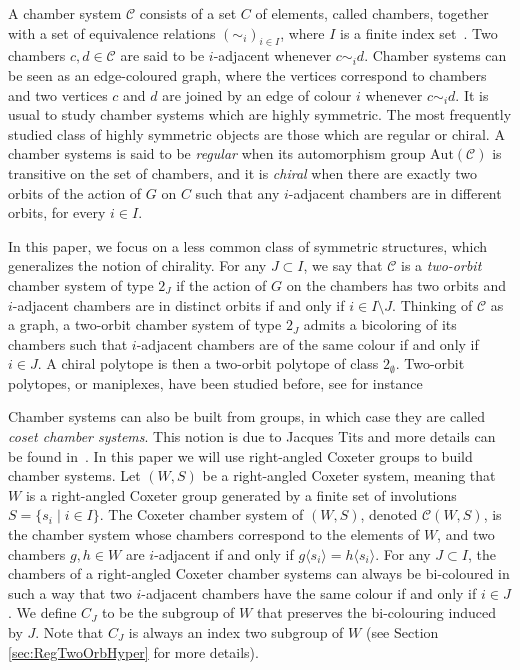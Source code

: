 \documentclass[11pt,letterpaper]{amsart}
\newcommand{\Aut}{\mathrm{Aut}}
\newcommand{\C}{\mathcal{C}}
\begin{document}
A chamber system $\C$ consists of a set $C$ of elements, called chambers, together with a set of equivalence relations $(\sim_i)_{i\in I}$, where $I$ is a finite index set~\cite{buekenhout2013diagram}. Two chambers $c,d\in \C$ are said to be $i$-adjacent whenever $c\sim_i d$. Chamber systems can be seen as an edge-coloured graph, where the vertices correspond to chambers and two vertices $c$ and $d$ are joined by an edge of colour $i$ whenever $c \sim_i d$.
It is usual to study chamber systems which are highly symmetric. The most frequently studied class of highly symmetric objects are those which are regular or chiral. A chamber systems is said to be \emph{regular} when its automorphism group $\Aut(\C)$ is transitive on the set of chambers, and it is \emph{chiral} when there are exactly two orbits of the action of $G$ on $C$ such that any $i$-adjacent chambers are in different orbits, for every $i\in I$. 

In this paper, we focus on a less common class of symmetric structures, which generalizes the notion of chirality. For any $J\subset I$, we say that $\C$ is a \emph{two-orbit} chamber system of type $2_J$ if the action of $G$ on the chambers has two orbits and $i$-adjacent chambers are in distinct orbits if and only if $i\in I\setminus J$. Thinking of $\C$ as a graph, a two-orbit chamber system of type $2_J$ admits a bicoloring of its chambers such that $i$-adjacent chambers are of the same colour if and only if $i \in J$. A chiral polytope is then a two-orbit polytope of class $2_\emptyset$. Two-orbit polytopes, or maniplexes, have been studied before, see for instance \cite{Pellicer_2025,ExistanceTwoOrbitsManiplexes,Polytopality2orbitsmaniplexes}

Chamber systems can also be built from groups, in which case they are called \emph{coset chamber systems}. This notion is due to Jacques Tits and more details can be found in~\cite{buekenhout2013diagram}. In this paper we will use right-angled Coxeter groups to build chamber systems.
Let $(W,S)$ be a right-angled Coxeter system, meaning that $W$ is a right-angled Coxeter group generated by a finite set of involutions $S = \{s_i\mid i\in I\}$. The Coxeter chamber system of $(W,S)$, denoted $\C(W,S)$, is the chamber system whose chambers correspond to the elements of $W$, and two chambers $g,h\in W$ are $i$-adjacent if and only if $g\langle s_i\rangle = h\langle s_i\rangle$. For any $J \subset I$, the chambers of a right-angled Coxeter chamber systems can always be bi-coloured in such a way that two $i$-adjacent chambers have the same colour if and only if $i \in J$. We define $C_J$ to be the subgroup of $W$ that preserves the bi-colouring induced by $J$. Note that $C_J$ is always an index two subgroup of $W$ (see Section \ref{sec:RegTwoOrbHyper} for more details). 
\end{document}
